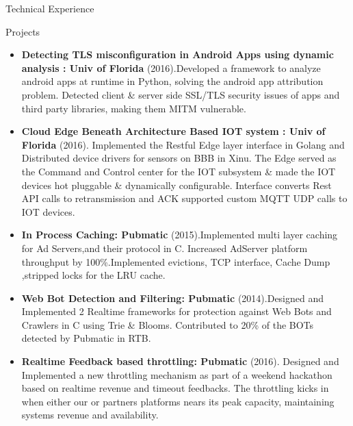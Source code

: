 \documentclass[]{mcdowellcv}
\begin{document}
	\begin{cvsection}{Technical Experience}
		\begin{cvsubsection}{Projects}{}{}
			\begin{itemize}
				\item \textbf{Detecting TLS misconfiguration in Android Apps using dynamic analysis : Univ of Florida} (2016).Developed a framework to analyze android apps at runtime in Python, solving the android app attribution problem. Detected client \& server side SSL/TLS security issues of apps and third party libraries, making them MITM vulnerable.
				\item \textbf{Cloud Edge Beneath Architecture Based IOT system : Univ of Florida} (2016).  Implemented the Restful Edge layer interface in Golang and Distributed device drivers for sensors on BBB in Xinu. The Edge served as the Command and Control center for the IOT subsystem \& made the IOT devices hot pluggable \& dynamically configurable. Interface converts Rest API calls to retransmission and ACK supported custom MQTT UDP calls to IOT devices.
				\item \textbf{In Process Caching: Pubmatic} (2015).Implemented multi layer caching for Ad Servers,and their protocol in C. Increased AdServer platform throughput by 100\%.Implemented evictions, TCP interface, Cache Dump ,stripped locks for the LRU cache.
				
				\item \textbf{Web Bot Detection and Filtering: Pubmatic} (2014).Designed and Implemented 2 Realtime frameworks for protection against Web Bots and Crawlers in C using Trie \& Blooms. Contributed to 20\% of the BOTs detected by Pubmatic in RTB.

				\item \textbf{Realtime Feedback based throttling: Pubmatic} (2016).  Designed and Implemented a new throttling mechanism as part of a weekend hackathon based on realtime revenue and timeout feedbacks. The throttling kicks in when either our or partners platforms nears its peak capacity, maintaining systems revenue and availability.

			\end{itemize}
		\end{cvsubsection}
	\end{cvsection}
	
\end{document}
